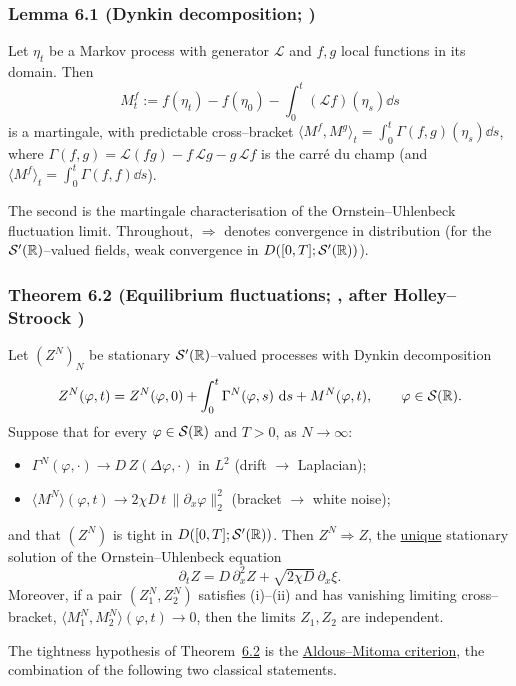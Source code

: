 \documentclass[11pt]{article}
\theoremstyle{plain}
\theoremstyle{definition}
\theoremstyle{remark}
\newcommand{\To}{\Rightarrow}\newcommand{\so}{\mathfrak{so}}
\newcommand{\cL}{\mathcal L}\newcommand{\cO}{\mathcal O}\newcommand{\cE}{\mathcal E}
\begin{document}
\subsubsection{Lemma 6.1 (Dynkin decomposition; {\cite[App.~1.5]{KL}})}\label{lem_dynkin}

Let $\eta_t$ be a Markov process with generator $\cL$ and $f,g$ local functions in its
domain. Then
\[
  M^f_t:=f(\eta_t)-f(\eta_0)-\int_0^t(\cL f)(\eta_s)\dd s
\]
is a martingale, with predictable cross--bracket
$\langle M^f,M^g\rangle_t=\int_0^t\Gamma(f,g)(\eta_s)\dd s$, where
$\Gamma(f,g)=\cL(fg)-f\,\cL g-g\,\cL f$ is the carr\'e du champ (and
$\langle M^f\rangle_t=\int_0^t\Gamma(f,f)\dd s$).
\par

\noindent The second is the martingale characterisation of the Ornstein--Uhlenbeck
fluctuation limit. Throughout, $\To$ denotes convergence in distribution (for the
$\mathcal S'(\mathbb{R})$--valued fields, weak convergence in $D([0,T];\mathcal S'(\mathbb{R}))$).

\subsubsection{Theorem 6.2 (Equilibrium fluctuations; {\cite[Ch.~11]{KL}}, after Holley--Stroock \cite{HolleyStroock})}\label{thm_mp}

Let $(Z^N)_N$ be stationary $\mathcal S'(\mathbb{R})$--valued processes with Dynkin decomposition
\[
  Z^N(\varphi,t)=Z^N(\varphi,0)+\int_0^t\Gamma^N(\varphi,s)\,\,\mathrm{d} s+M^N(\varphi,t),
  \qquad \varphi\in\mathcal S(\mathbb{R}).
\]
Suppose that for every $\varphi\in\mathcal S(\mathbb{R})$ and $T>0$, as $N\to\infty$:
\begin{itemize}
\item[\textup{(i)}] $\Gamma^N(\varphi,\cdot)\to D\,Z(\Delta\varphi,\cdot)$ in $L^2$
  \quad(drift $\to$ Laplacian);
\item[\textup{(ii)}] $\langle M^N\rangle(\varphi,t)\to 2\chi D\,t\,\|\partial_x\varphi\|_2^2$
  \quad(bracket $\to$ white noise);
\end{itemize}
and that $(Z^N)$ is tight in $D([0,T];\mathcal S'(\mathbb{R}))$. Then $Z^N\To Z$, the \underline{unique}
stationary solution of the Ornstein--Uhlenbeck equation
\[
  \partial_t Z=D\,\partial_x^2 Z+\sqrt{2\chi D}\,\partial_x\xi .
\]
Moreover, if a pair $(Z_1^N,Z_2^N)$ satisfies \textup{(i)--(ii)} and has vanishing
limiting cross--bracket, $\langle M_1^N,M_2^N\rangle(\varphi,t)\to0$, then the limits
$Z_1,Z_2$ are independent.
\par

\noindent The tightness hypothesis of Theorem~\hyperref[thm_mp]{6.2} is the \underline{Aldous--Mitoma
criterion}, the combination of the following two classical statements.
\end{document}
